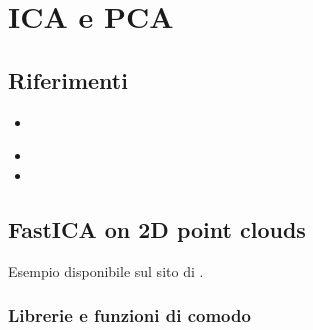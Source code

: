 \documentclass[letterpaper,10pt,italian]{jupyterBook}
\begin{document}
\section{ICA e PCA}
\label{\detokenize{ch/ai/ica-pca:ica-e-pca}}\label{\detokenize{ch/ai/ica-pca:ai-ul-ica-pca}}\label{\detokenize{ch/ai/ica-pca::doc}}

\subsection{Riferimenti}
\label{\detokenize{ch/ai/ica-pca:riferimenti}}
\sphinxAtStartPar
{}
\begin{itemize}
\item {} 
\sphinxAtStartPar
{}

\end{itemize}

\sphinxAtStartPar
{}
\begin{itemize}
\item {} 
\sphinxAtStartPar
{}

\item {} 
\sphinxAtStartPar
{}

\end{itemize}

\sphinxstepscope


\subsection{FastICA on 2D point clouds}
\label{\detokenize{ch/ai/ica-pca-example-2d:fastica-on-2d-point-clouds}}\label{\detokenize{ch/ai/ica-pca-example-2d:ai-ul-ica-pca-example-2d}}\label{\detokenize{ch/ai/ica-pca-example-2d::doc}}
\sphinxAtStartPar
Esempio disponibile sul sito di .


\subsubsection{Librerie e funzioni di comodo}
\label{\detokenize{ch/ai/ica-pca-example-2d:librerie-e-funzioni-di-comodo}}
\end{document}
